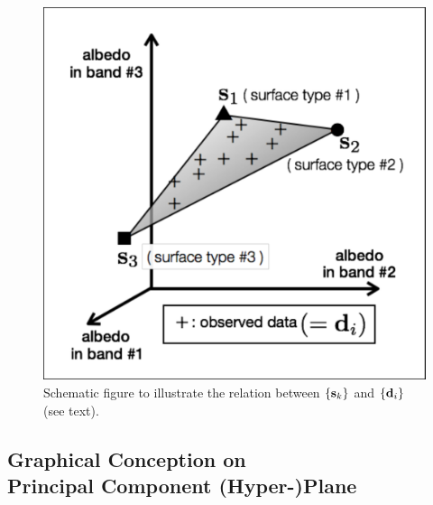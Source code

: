 \documentclass[iop,numberedappendix,apj,]{emulateapj}
\begin{document}



\begin{figure}[b!]
    \begin{center}
\includegraphics[width=\hsize]{schematics.pdf}
    \end{center}
    \caption{Schematic figure to illustrate the relation between $\{{\bf s}_k\} $ and $\{{\bf d}_i\} $ (see text). }
\label{fig:schematic}
\end{figure}


\subsection{Graphical Conception on \\Principal Component (Hyper-)Plane}
\label{ss:PCplane}
\end{document}
